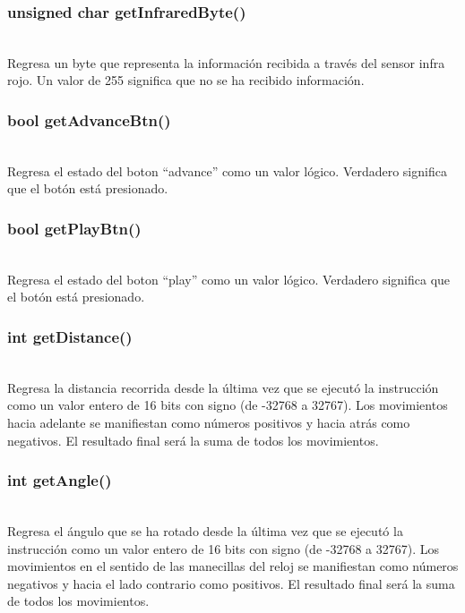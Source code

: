 \documentclass[letterpaper]{book}
\begin{document}
\subsubsection{unsigned char getInfraredByte()}\mbox{}\\
Regresa un byte que representa la información recibida a través del sensor infra rojo. Un valor de 255 significa que no se ha recibido información.\\
\subsubsection{bool getAdvanceBtn()}\mbox{}\\
Regresa el estado del boton ``advance'' como un valor lógico. Verdadero significa que el botón está presionado.\\
\subsubsection{bool getPlayBtn()}\mbox{}\\
Regresa el estado del boton ``play'' como un valor lógico. Verdadero significa que el botón está presionado.\\
\subsubsection{int getDistance()}\mbox{}\\
Regresa la distancia recorrida desde la última vez que se ejecutó la instrucción como un valor entero de 16 bits con signo (de -32768 a 32767). Los movimientos hacia adelante se manifiestan como números positivos y hacia atrás como negativos. El resultado final será la suma de todos los movimientos.\\
\subsubsection{int getAngle()}\mbox{}\\
Regresa el ángulo que se ha rotado desde la última vez que se ejecutó la instrucción como un valor entero de 16 bits con signo (de -32768 a 32767). Los movimientos en el sentido de las manecillas del reloj se manifiestan como números negativos y hacia el lado contrario como positivos. El resultado final será la suma de todos los movimientos.\\
\end{document}
